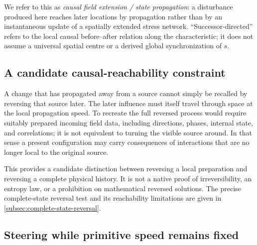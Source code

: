 \documentclass[11pt]{article}
\theoremstyle{definition}
\begin{document}
We refer to this as \emph{causal field extension / state propagation}: a disturbance
produced here reaches later locations by propagation rather than by an instantaneous
update of a spatially extended stress network.  ``Successor-directed'' refers to the local causal
before--after relation along the characteristic; it does not assume a universal spatial
centre or a derived global synchronization of $s$.

\subsection{A candidate causal-reachability constraint}
\label{subsec:causal_reachability}

A change that has propagated away from a source cannot simply be recalled by
reversing that source later.  The later influence must itself travel through
space at the local propagation speed.  To recreate the full reversed process
would require suitably prepared incoming field data, including directions,
phases, internal state, and correlations; it is not equivalent to turning the
visible source around.  In that sense a present configuration may carry
consequences of interactions that are no longer local to the original source.

This provides a candidate distinction between reversing a local preparation
and reversing a complete physical history.  It is not a native proof of
irreversibility, an entropy law, or a prohibition on mathematical reversed
solutions.  The precise complete-state reversal test and its reachability
limitations are given in \cref{subsec:complete-state-reversal}.


\subsection{Steering while primitive speed remains fixed}
\label{subsec:projected_steering}
\end{document}
